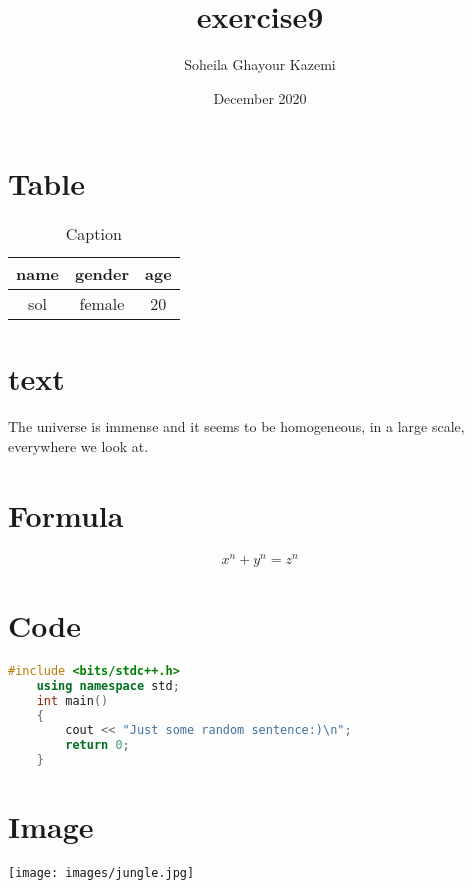 \documentclass{article}
\title{exercise9}
\author{Soheila Ghayour Kazemi}
\date{December 2020}
\begin{document}
\maketitle

\section{Table}
\begin{table}[]
    \centering
    \begin{tabular}{c|c|c}
\hline
name & gender & age\\
\hline
sol &   female & 20\\
\hline
\end{tabular}
    \caption{Caption}
    \label{tab:my_label}
\end{table}

\section{text}
The universe is immense and it seems to be homogeneous, 
in a large scale, everywhere we look at.
\section{Formula}
\begin{center}
    {\Large
       \[ x^n + y^n = z^n \]
    } 
\end{center}
\section{Code}
\begin{lstlisting}[language=C++]
    #include <bits/stdc++.h>
    using namespace std;
    int main()
    {    
        cout << "Just some random sentence:)\n";
        return 0;
    }
\end{lstlisting}
\section{Image}
\begin{center}
    \texttt{[image: images/jungle.jpg]}
\end{center}
\end{document}
